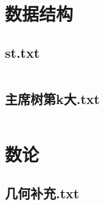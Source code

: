 \documentclass[a4paper,11pt]{article}
\begin{document}
\section{数据结构}
\subsection{st.txt}
\inputminted{c++}{"D:/tmplz/templates/数据结构/st.txt"}
\subsection{主席树第k大.txt}
\inputminted{c++}{"D:/tmplz/templates/数据结构/主席树第k大.txt"}
\section{数论}
\subsection{几何补充.txt}
\inputminted{c++}{"D:/tmplz/templates/数论/几何补充.txt"}
\end{document}
